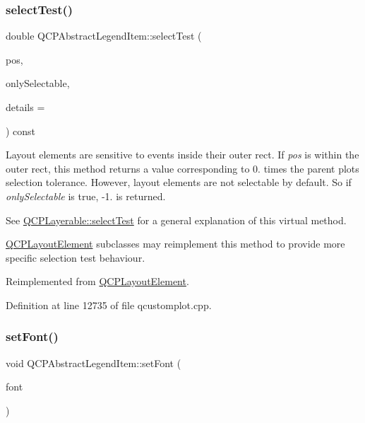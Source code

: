 \subsubsection{\texorpdfstring{select\+Test()}{selectTest()}}
{\footnotesize\ttfamily double Q\+C\+P\+Abstract\+Legend\+Item\+::select\+Test (\begin{DoxyParamCaption}\item[{const Q\+PointF \&}]{pos,  }\item[{bool}]{only\+Selectable,  }\item[{Q\+Variant $\ast$}]{details = {} }\end{DoxyParamCaption}) const\hspace{0.3cm}{\ttfamily [virtual]}}

Layout elements are sensitive to events inside their outer rect. If {\itshape pos} is within the outer rect, this method returns a value corresponding to 0. times the parent plot\textquotesingle{}s selection tolerance. However, layout elements are not selectable by default. So if {\itshape only\+Selectable} is true, -\/1. is returned.

See \hyperlink{class_q_c_p_layerable_a04db8351fefd44cfdb77958e75c6288e}{Q\+C\+P\+Layerable\+::select\+Test} for a general explanation of this virtual method.

\hyperlink{class_q_c_p_layout_element}{Q\+C\+P\+Layout\+Element} subclasses may reimplement this method to provide more specific selection test behaviour. 

Reimplemented from \hyperlink{class_q_c_p_layout_element_a0b96ae0d7bcfa6e38188fcb1e73e143f}{Q\+C\+P\+Layout\+Element}.



Definition at line 12735 of file qcustomplot.\+cpp.

\mbox{\label{class_q_c_p_abstract_legend_item_a409c53455d8112f71d70c0c43eb10265}} 
\subsubsection{\texorpdfstring{set\+Font()}{setFont()}}
{\footnotesize\ttfamily void Q\+C\+P\+Abstract\+Legend\+Item\+::set\+Font (\begin{DoxyParamCaption}\item[{const Q\+Font \&}]{font }\end{DoxyParamCaption})}

